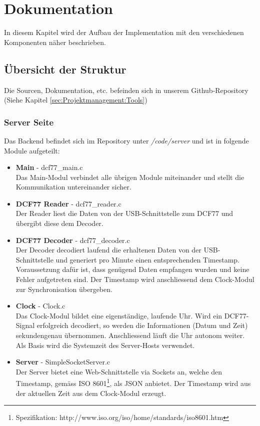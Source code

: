 
\chapter{Dokumentation}
In diesem Kapitel wird der Aufbau der Implementation mit den verschiedenen Komponenten näher beschrieben.

\section{Übersicht der Struktur}
Die Sourcen, Dokumentation, etc. befeinden sich in unserem Github-Repository (Siehe Kapitel \ref{sec:Projektmanagement:Tools})
\subsection{Server Seite}
Das Backend befindet sich im Repository unter \textit{/code/server} und ist in folgende Module aufgeteilt:

\begin{itemize}
\item {\textbf{Main} - dcf77\_main.c} \\
Das Main-Modul verbindet alle übrigen Module miteinander und stellt die Kommunikation untereinander sicher.

\item {\textbf{DCF77 Reader} - dcf77\_reader.c} \\
Der Reader liest die Daten von der USB-Schnittstelle zum DCF77 und übergibt diese dem Decoder.

\item {\textbf{DCF77 Decoder} - dcf77\_decoder.c}\\
Der Decoder decodiert laufend die erhaltenen Daten von der USB-Schnittstelle und generiert pro Minute einen entsprechenden Timestamp. Voraussetzung dafür ist, dass  genügend Daten empfangen wurden und keine Fehler aufgetreten sind. Der Timestamp wird anschliessend dem Clock-Modul zur Synchronisation übergeben.

\item {\textbf{Clock} - Clock.c}\\
Das Clock-Modul bildet eine eigenständige, laufende Uhr. Wird ein DCF77-Signal erfolgreich decodiert, so werden die Informationen (Datum und Zeit) sekundengenau übernommen. Anschliessend läuft die Uhr autonom weiter. Als Basis wird die Systemzeit des Server-Hosts verwendet.


\item {\textbf{Server} - SimpleSocketServer.c}\\
Der Server bietet eine Web-Schnittstelle via Sockets an, welche den Timestamp, gemäss ISO 8601\footnote{Spezifikation: http://www.iso.org/iso/home/standards/iso8601.htm}, als JSON anbietet. Der Timestamp wird aus der aktuellen Zeit aus dem Clock-Modul erzeugt.

\end{itemize} 

